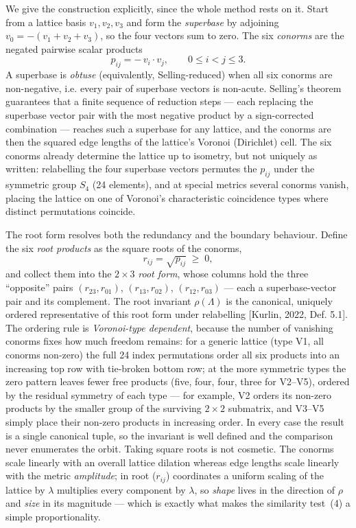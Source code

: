 \documentclass[11pt]{article}
\newcommand{\rootinv}{\rho}
\begin{document}
We give the construction explicitly, since the whole method rests on it. Start
from a lattice basis $v_1, v_2, v_3$ and form the \emph{superbase} by adjoining
$v_0 = -(v_1 + v_2 + v_3)$, so the four vectors sum to zero. The six
\emph{conorms} are the negated pairwise scalar products
\begin{equation}
p_{ij} = -\,v_i \!\cdot\! v_j, \qquad 0 \le i < j \le 3 .
\end{equation}
A superbase is \emph{obtuse} (equivalently, Selling-reduced) when all six conorms
are non-negative, i.e. every pair of superbase vectors is non-acute. Selling's
theorem guarantees that a finite sequence of reduction steps --- each replacing
the superbase vector pair with the most negative product by a sign-corrected
combination --- reaches such a superbase for any lattice, and the conorms are
then the squared edge lengths of the lattice's Voronoi (Dirichlet) cell. The six
conorms already determine the lattice up to isometry, but not uniquely as
written: relabelling the four superbase vectors permutes the $p_{ij}$ under the
symmetric group $S_4$ (24 elements), and at special metrics several conorms
vanish, placing the lattice on one of Voronoi's characteristic coincidence types
where distinct permutations coincide.

The root form resolves both the redundancy and the boundary behaviour. Define the
six \emph{root products} as the square roots of the conorms,
\begin{equation}
r_{ij} = \sqrt{p_{ij}} \;\ge\; 0 ,
\end{equation}
and collect them into the $2\times3$ \emph{root form}, whose columns hold the
three ``opposite'' pairs $(r_{23}, r_{01})$, $(r_{13}, r_{02})$, $(r_{12}, r_{03})$
--- each a superbase-vector pair and its complement. The root invariant
$\rootinv(\Lambda)$ is the canonical, uniquely ordered representative of this root
form under relabelling [Kurlin, 2022, Def. 5.1]. The ordering rule is
\emph{Voronoi-type dependent}, because the number of vanishing conorms fixes how
much freedom remains: for a generic lattice (type V1, all conorms non-zero) the
full 24 index permutations order all six products into an increasing top row with
tie-broken bottom row; at the more symmetric types the zero pattern leaves fewer
free products (five, four, four, three for V2--V5), ordered by the residual
symmetry of each type --- for example, V2 orders its non-zero products by the
smaller group of the surviving $2\times2$ submatrix, and V3--V5 simply place their
non-zero products in increasing order. In every case the result is a single
canonical tuple, so the invariant is well defined and the comparison never
enumerates the orbit. Taking square
roots is not cosmetic. The conorms scale linearly with an overall lattice
dilation whereas edge lengths scale linearly with the metric \emph{amplitude};
in root ($r_{ij}$) coordinates a uniform scaling of the lattice by $\lambda$
multiplies every component by $\lambda$, so \emph{shape} lives in the direction of
$\rootinv$ and \emph{size} in its magnitude --- which is exactly what makes the
similarity test~(4) a simple proportionality.
\end{document}
